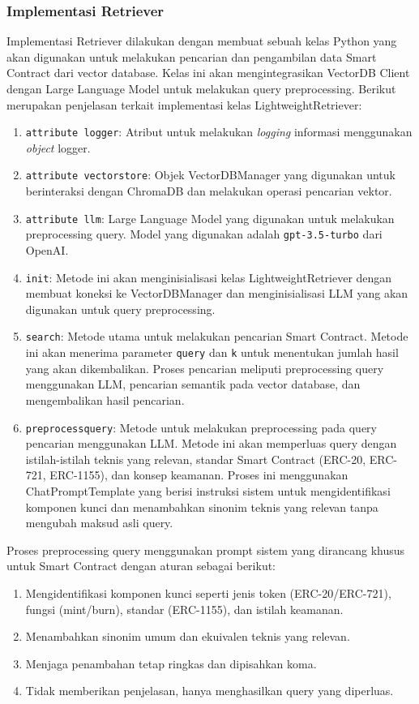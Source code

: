 \subsubsection{Implementasi Retriever}

Implementasi Retriever dilakukan dengan membuat sebuah kelas Python yang akan digunakan untuk melakukan pencarian dan pengambilan data Smart Contract dari vector database. Kelas ini akan mengintegrasikan VectorDB Client dengan Large Language Model untuk melakukan query preprocessing. Berikut merupakan penjelasan terkait implementasi kelas LightweightRetriever:

\begin{enumerate}
    \item \texttt{attribute logger}: Atribut untuk melakukan \textit{logging} informasi menggunakan \textit{object} logger.
    \item \texttt{attribute vector\textunderscore store}: Objek VectorDBManager yang digunakan untuk berinteraksi dengan ChromaDB dan melakukan operasi pencarian vektor.
    \item \texttt{attribute llm}: Large Language Model yang digunakan untuk melakukan preprocessing query. Model yang digunakan adalah \texttt{gpt-3.5-turbo} dari OpenAI.
    \item \texttt{\textunderscore\textunderscore init\textunderscore\textunderscore}: Metode ini akan menginisialisasi kelas LightweightRetriever dengan membuat koneksi ke VectorDBManager dan menginisialisasi LLM yang akan digunakan untuk query preprocessing.
    \item \texttt{search}: Metode utama untuk melakukan pencarian Smart Contract. Metode ini akan menerima parameter \texttt{query} dan \texttt{k} untuk menentukan jumlah hasil yang akan dikembalikan. Proses pencarian meliputi preprocessing query menggunakan LLM, pencarian semantik pada vector database, dan mengembalikan hasil pencarian.
    \item \texttt{preprocess\textunderscore query}: Metode untuk melakukan preprocessing pada query pencarian menggunakan LLM. Metode ini akan memperluas query dengan istilah-istilah teknis yang relevan, standar Smart Contract (ERC-20, ERC-721, ERC-1155), dan konsep keamanan. Proses ini menggunakan ChatPromptTemplate yang berisi instruksi sistem untuk mengidentifikasi komponen kunci dan menambahkan sinonim teknis yang relevan tanpa mengubah maksud asli query.
\end{enumerate}

Proses preprocessing query menggunakan prompt sistem yang dirancang khusus untuk Smart Contract dengan aturan sebagai berikut:
\begin{enumerate}
    \item Mengidentifikasi komponen kunci seperti jenis token (ERC-20/ERC-721), fungsi (mint/burn), standar (ERC-1155), dan istilah keamanan.
    \item Menambahkan sinonim umum dan ekuivalen teknis yang relevan.
    \item Menjaga penambahan tetap ringkas dan dipisahkan koma.
    \item Tidak memberikan penjelasan, hanya menghasilkan query yang diperluas.
\end{enumerate}


